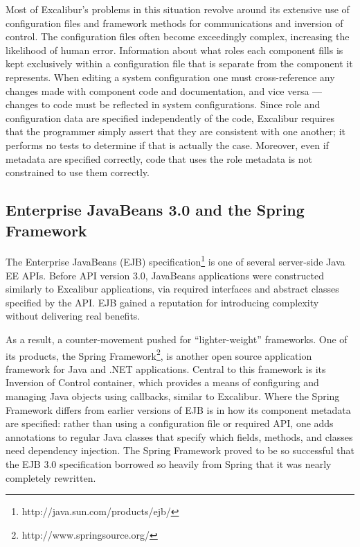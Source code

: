 \documentclass{article}
\begin{document}
Most of Excalibur's problems in this situation revolve around its extensive use of configuration files and framework methods for communications and inversion of control.
The configuration files often become exceedingly complex, increasing the likelihood of human error.
Information about what roles each component fills is kept exclusively within a configuration file that is separate from the component it represents.
When editing a system configuration one must cross-reference any changes made with component code and documentation, and vice versa --- changes to code must be reflected in system configurations.
Since role and configuration data are specified independently of the code, Excalibur requires that the programmer simply assert that they are consistent with one another; it performs no tests to determine if that is actually the case.
Moreover, even if metadata are specified correctly, code that uses the role metadata is not constrained to use them correctly.

\subsection{Enterprise JavaBeans 3.0 and the Spring Framework}

The Enterprise JavaBeans (EJB) specification\footnote{http://java.sun.com/products/ejb/} is one of several server-side Java EE APIs.
Before API version 3.0, JavaBeans applications were constructed similarly to Excalibur applications, via required interfaces and abstract classes specified by the API.
EJB gained a reputation for introducing complexity without delivering real benefits.

As a result, a counter-movement pushed for ``lighter-weight'' frameworks.
One of its products, the Spring Framework\footnote{http://www.springsource.org/}, is another open source application framework for Java and .NET applications.
Central to this framework is its Inversion of Control container, which provides a means of configuring and managing Java objects using callbacks, similar to Excalibur.
Where the Spring Framework differs from earlier versions of EJB is in how its component metadata are specified:  rather than using a configuration file or required API, one adds annotations to regular Java classes that specify which fields, methods, and classes need dependency injection.
The Spring Framework proved to be so successful that the EJB 3.0 specification borrowed so heavily from Spring that it was nearly completely rewritten.
\end{document}
